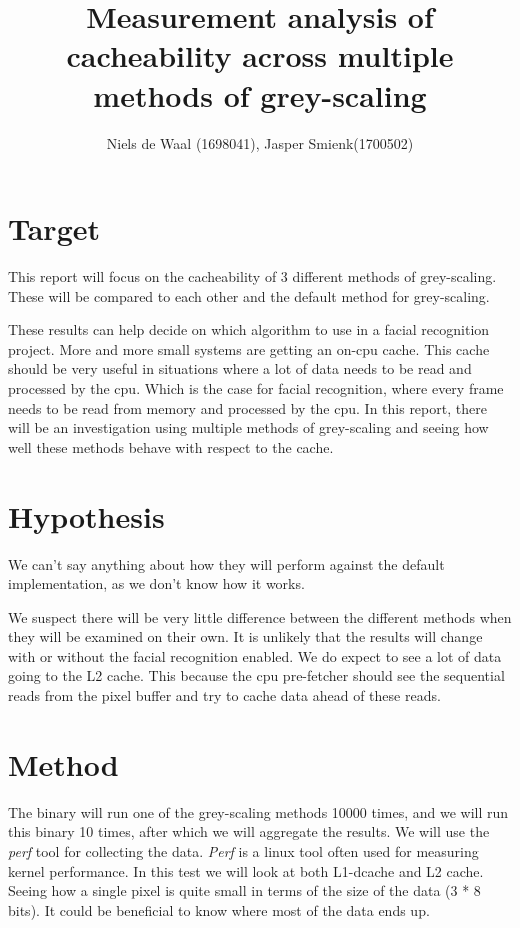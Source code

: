 \documentclass[a4paper]{article}
\begin{document}
\title{Measurement analysis of cacheability across multiple methods of grey-scaling}
\author{Niels de Waal (1698041), Jasper Smienk(1700502)}
\maketitle
\newpage

\tableofcontents
\newpage

\section{Target}
This report will focus on the cacheability of 3 different methods of grey-scaling. These will be compared to each other and the default method for grey-scaling.

These results can help decide on which algorithm to use in a facial recognition project. More and more small systems are getting an on-cpu cache. This cache should be very useful in situations where a lot of data needs to be read and processed by the cpu. Which is the case for facial recognition, where every frame needs to be read from memory and processed by the cpu. In this report, there will be an investigation using multiple methods of grey-scaling and seeing how well these methods behave with respect to the cache.

\section{Hypothesis}
We can't say anything about how they will perform against the default implementation, as we don't know how it works.

We suspect there will be very little difference between the different methods when they will be examined on their own. It is unlikely that the results will change with or without the facial recognition enabled. We do expect to see a lot of data going to the L2 cache. This because the cpu pre-fetcher should see the sequential reads from the pixel buffer and try to cache data ahead of these reads.

\section{Method}
The binary will run one of the grey-scaling methods 10000 times, and we will run this binary 10 times, after which we will aggregate the results. We will use the \textit{perf} tool for collecting the data. \textit{Perf} is a linux tool often used for measuring kernel performance. In this test we will look at both L1-dcache and L2 cache. Seeing how a single pixel is quite small in terms of the size of the data (3 * 8 bits). It could be beneficial to know where most of the data ends up.
\end{document}
